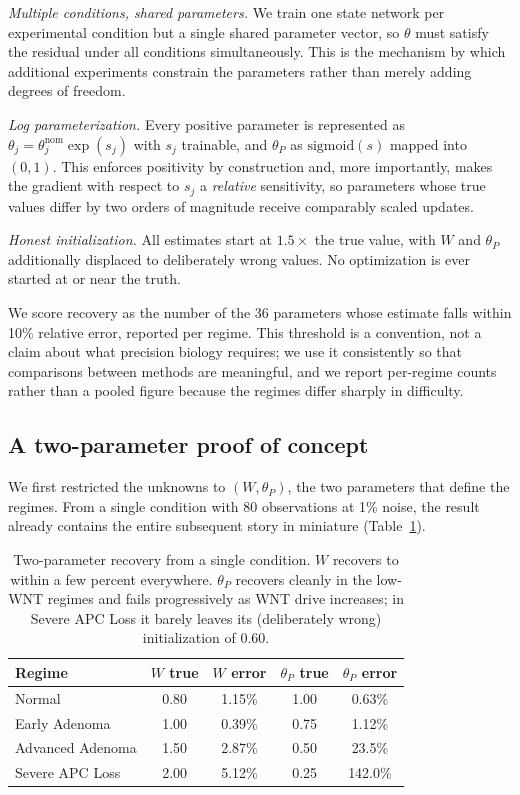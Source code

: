 \documentclass[11pt]{article}
\newcommand{\thP}{\theta_P}
\begin{document}
\emph{Multiple conditions, shared parameters.} We train one state network per
experimental condition but a single shared parameter vector, so $\theta$ must
satisfy the residual under all conditions simultaneously. This is the
mechanism by which additional experiments constrain the parameters rather than
merely adding degrees of freedom.

\emph{Log parameterization.} Every positive parameter is represented as
$\theta_j = \theta_j^{\text{nom}}\exp(s_j)$ with $s_j$ trainable, and $\thP$ as
$\mathrm{sigmoid}(s)$ mapped into $(0,1)$. This enforces positivity by
construction and, more importantly, makes the gradient with respect to $s_j$ a
\emph{relative} sensitivity, so parameters whose true values differ by two
orders of magnitude receive comparably scaled updates.

\emph{Honest initialization.} All estimates start at $1.5\times$ the true value,
with $W$ and $\thP$ additionally displaced to deliberately wrong values. No
optimization is ever started at or near the truth.

We score recovery as the number of the 36 parameters whose estimate falls
within 10\% relative error, reported per regime. This threshold is a
convention, not a claim about what precision biology requires; we use it
consistently so that comparisons between methods are meaningful, and we report
per-regime counts rather than a pooled figure because the regimes differ
sharply in difficulty.

\subsection{A two-parameter proof of concept}

We first restricted the unknowns to $(W, \thP)$, the two parameters that define
the regimes. From a single condition with 80 observations at 1\% noise, the
result already contains the entire subsequent story in miniature
(Table~\ref{tab:twoparam}).

\begin{table}[H]
\centering
\begin{tabular}{lcccc}
\toprule
\textbf{Regime} & $W$ \textbf{true} & $W$ \textbf{error} &
$\thP$ \textbf{true} & $\thP$ \textbf{error} \\
\midrule
Normal            & 0.80 & 1.15\% & 1.00 & 0.63\% \\
Early Adenoma     & 1.00 & 0.39\% & 0.75 & 1.12\% \\
Advanced Adenoma  & 1.50 & 2.87\% & 0.50 & 23.5\% \\
Severe APC Loss   & 2.00 & 5.12\% & 0.25 & 142.0\% \\
\bottomrule
\end{tabular}
\caption{Two-parameter recovery from a single condition. $W$ recovers to within
a few percent everywhere. $\thP$ recovers cleanly in the low-WNT regimes and
fails progressively as WNT drive increases; in Severe APC Loss it barely leaves
its (deliberately wrong) initialization of $0.60$.}
\label{tab:twoparam}
\end{table}
\end{document}

